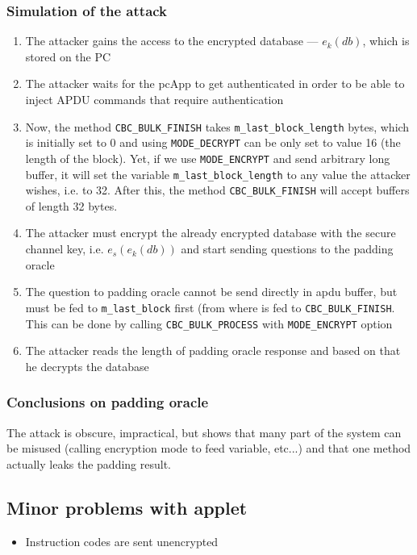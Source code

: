 \documentclass[11pt,a4paper]{article}
\begin{document}
\subsubsection*{Simulation of the attack}
\begin{enumerate}
	\item The attacker gains the access to the encrypted database --- $e_k(db)$, which is stored on the PC
	\item The attacker waits for the pcApp to get authenticated in order to be able to inject APDU commands that require authentication
	\item Now, the method \texttt{CBC\_BULK\_FINISH} takes \texttt{m\_last\_block\_length} bytes, which is initially set to 0 and using \texttt{MODE\_DECRYPT} can be only set to value 16 (the length of the block). 
	    Yet, if we use \texttt{MODE\_ENCRYPT} and send arbitrary long buffer, it will set the variable \texttt{m\_last\_block\_length} to any value the attacker wishes, i.e. to 32. After this, the method \texttt{CBC\_BULK\_FINISH} will accept buffers of length 32 bytes. 
	\item The attacker must encrypt the already encrypted database with the secure channel key, i.e. $e_s(e_k(db))$ and start sending questions to the padding oracle
	\item The question to padding oracle cannot be send directly in apdu buffer, but must be fed to \texttt{m\_last\_block} first (from where is fed to \texttt{CBC\_BULK\_FINISH}. This can be done by calling \texttt{CBC\_BULK\_PROCESS} with \texttt{MODE\_ENCRYPT} option
	\item The attacker reads the length of padding oracle response and based on that he decrypts the database 
\end{enumerate}

\subsubsection*{Conclusions on padding oracle}

The attack is obscure, impractical, but shows that many part of the system can be misused (calling encryption mode to feed variable, etc...) and that one method actually leaks the padding result. 


\subsection*{Minor problems with applet}

\begin{itemize}
	\item Instruction codes are sent unencrypted
\end{itemize}




 
\end{document}
